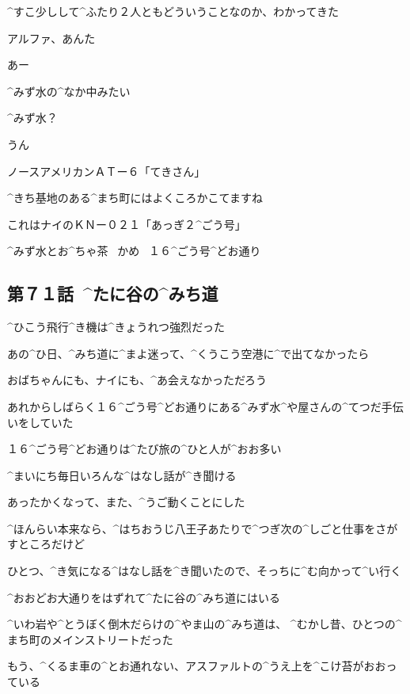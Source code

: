 \Alpha ^{すこ}{少}しして^{ふたり}{２人}ともどういうことなのか、わかってきた

\page[73]
\Nai アルファ、あんた

\page[74]
\Alpha あー

\Alpha ^{みず}{水}の^{なか}{中}みたい

\Nai ^{みず}{水}？

\Alpha うん

\page[75]
\Sign ノースアメリカンＡＴー６「てきさん」

\Sign ^{きち}{基地}のある^{まち}{町}にはよくころかこてますね

\Sign これはナイのＫＮー０２１「あっぎ２^{ごう}{号}」

\page[76]
\Sign ^{みず}{水}とお^{ちゃ}{茶}
\ かめ
\ １６^{ごう}{号}^{どお}{通}り


\subsection{第７１話\ ^{たに}{谷}の^{みち}{道}}

\page[78]
\Alpha ^{ひこう}{飛行}^{き}{機}は^{きょうれつ}{強烈}だった

\Alpha あの^{ひ}{日}、^{みち}{道}に^{まよ}{迷}って、^{くうこう}{空港}に^{で}{出}てなかったら

\Alpha おばちゃんにも、ナイにも、^{あ}{会}えなかっただろう

\page[79]
\Alpha あれからしばらく１６^{ごう}{号}^{どお}{通}りにある^{みず}{水}^{や}{屋}さんの^{てつだ}{手伝}いをしていた

\Alpha １６^{ごう}{号}^{どお}{通}りは^{たび}{旅}の^{ひと}{人}が^{おお}{多}い

\Alpha ^{まいにち}{毎日}いろんな^{はなし}{話}が^{き}{聞}ける

\Alpha あったかくなって、また、^{うご}{動}くことにした

\Alpha ^{ほんらい}{本来}なら、^{はちおうじ}{八王子}あたりで^{つぎ}{次}の^{しごと}{仕事}をさがすところだけど

\Alpha ひとつ、^{き}{気}になる^{はなし}{話}を^{き}{聞}いたので、そっちに^{む}{向}かって^{い}{行}く

\page[80]
\Alpha ^{おおどお}{大通}りをはずれて^{たに}{谷}の^{みち}{道}にはいる

\Alpha ^{いわ}{岩}や^{とうぼく}{倒木}だらけの^{やま}{山}の^{みち}{道}は、
^{むかし}{昔}、ひとつの^{まち}{町}のメインストリートだった

\Alpha もう、^{くるま}{車}の^{とお}{通}れない、アスファルトの^{うえ}{上}を^{こけ}{苔}がおおっている

